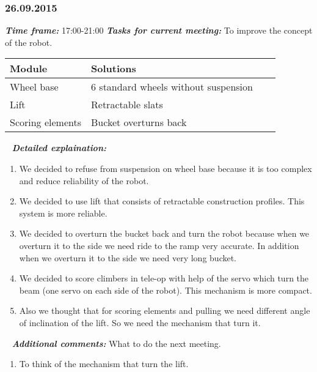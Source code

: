 \subsubsection{26.09.2015}
	\textit{\textbf{Time frame:}} 17:00-21:00 \newline \newline
	\textit{\textbf{Tasks for current meeting:}} To improve the concept of the robot.

  \begin{table}[H]
	\vspace{-2mm}
	\begin{center}
		\begin{tabular}{|p{0.3\linewidth}|p{0.7\linewidth}|}
			\hline
			Module & Solutions \\
			\hline
			Wheel base & 6 standard wheels without suspension \\
			\hline
			Lift & Retractable slats \\
			\hline
			Scoring elements & Bucket overturns back \\
			\hline
		\end{tabular}
	\end{center}
  \end{table}
  
   \newline
  \textit{\textbf{Detailed explaination:}}
  \begin{enumerate}
  	\item We decided to refuse from suspension on wheel base because it is too complex and reduce reliability of the robot.
  	
  	\item We decided to use lift that consists of retractable construction profiles. This system is more reliable.
  	
  	\item We decided to overturn the bucket back and turn the robot because when we overturn it to the side we need ride to the ramp very accurate. In addition when we overturn it to the side we need very long bucket. 
  	
  	\item We decided to score climbers in tele-op with help of the servo which turn the beam (one servo on each side of the robot). This mechanism is more compact.
  	
  	\item Also we thought that for scoring elements and pulling we need different angle of inclination of the lift. So we need the mechanism that turn it.
  	
  \end{enumerate}
  
   \newline
  \textit{\textbf{Additional comments:}} What to do the next meeting.
  \begin{enumerate}
  	\item To think of the mechanism that turn the lift.
  \end{enumerate}
  
    \newline

\fillpage
